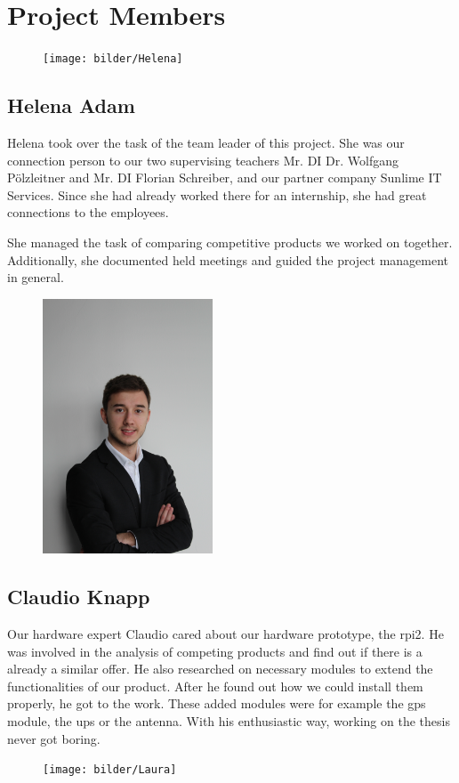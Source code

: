 \chapter*{Project Members}
\begin{figure}
    \texttt{[image: bilder/Helena]}
\end{figure}
\section*{Helena Adam}
Helena took over the task of the team leader of this project. She was our connection person to our two supervising teachers Mr. DI Dr. Wolfgang Pölzleitner and Mr. DI Florian Schreiber, and our partner company Sunlime IT Services. Since she had already worked there for an internship, she had great connections to the employees.

She managed the task of comparing competitive products we worked on together. Additionally, she documented held meetings and guided the project management in general.
\begin{figure}
	\includegraphics[width=0.45\textwidth, angle =-90]{bilder/Claudio}
\end{figure}
\section*{Claudio Knapp}
Our hardware expert Claudio cared about our hardware prototype, the \gls{rpi2}. He was involved in the analysis of competing products and find out if there is a already a similar offer. He also researched on necessary modules to extend the functionalities of our product. After he found out how we could install them properly, he got to the work. These added modules were for example the \gls{gps} module, the \gls{ups} or the antenna. With his enthusiastic way, working on the thesis never got boring. 
\begin{figure}
    \texttt{[image: bilder/Laura]}
\end{figure}
